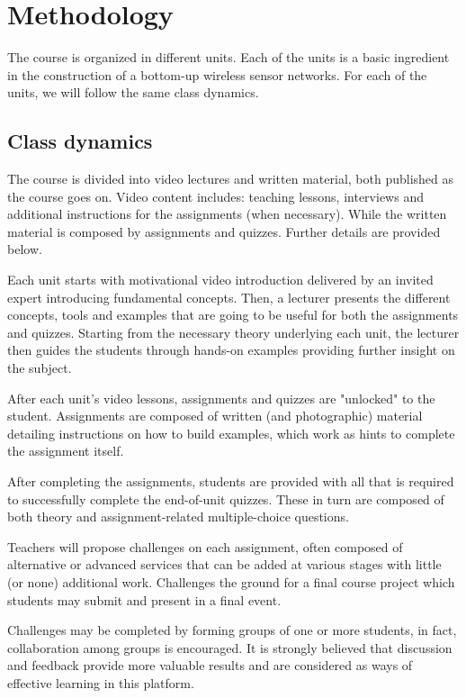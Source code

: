 \documentclass[oneside]{book}   %
\begin{document}
\chapter{Methodology}

The course is organized in different units.
Each of the units is a basic ingredient in the construction of a bottom-up wireless sensor networks.
For each of the units, we will follow the same class dynamics.

\section{Class dynamics}

The course is divided into video lectures and written material, both published as the course goes on. Video content includes: teaching lessons, interviews and additional instructions for the assignments (when necessary). While the written material is composed by assignments and quizzes. Further details are provided below.

Each unit starts with motivational video introduction delivered by an invited expert introducing fundamental concepts.
Then, a lecturer presents the different concepts, tools and examples that are going to be useful for both the assignments and quizzes.
Starting from the necessary theory underlying each unit, the lecturer then guides the students through hands-on examples providing further insight on the subject.

After each unit's video lessons, assignments and quizzes are "unlocked" to the student. Assignments are composed of written (and photographic) material detailing instructions on how to build examples, which work as hints to complete the assignment itself.

After completing the assignments, students are provided with all that is required to successfully complete the end-of-unit quizzes. These in turn are composed of both theory and assignment-related multiple-choice questions.

Teachers will propose challenges on each assignment, often composed of alternative or advanced services that can be added at various stages with little (or none) additional work. Challenges the ground for a final course project which students may submit and present in a final event.

Challenges may be completed by forming groups of one or more students, in fact, collaboration among groups is encouraged. It is strongly believed that discussion and feedback provide more valuable results and are considered as ways of effective learning in this platform.
\end{document}
